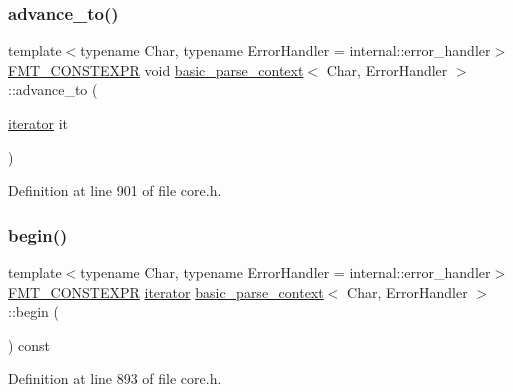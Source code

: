 \subsubsection{\texorpdfstring{advance\+\_\+to()}{advance\_to()}}
{\footnotesize\ttfamily template$<$typename Char, typename Error\+Handler = internal\+::error\+\_\+handler$>$ \\
\hyperlink{core_8h_a69201cb276383873487bf68b4ef8b4cd}{F\+M\+T\+\_\+\+C\+O\+N\+S\+T\+E\+X\+PR} void \hyperlink{classbasic__parse__context}{basic\+\_\+parse\+\_\+context}$<$ Char, Error\+Handler $>$\+::advance\+\_\+to (\begin{DoxyParamCaption}\item[{\hyperlink{classbasic__parse__context_ac3ff96575e89371a99076d8e84dbdbee}{iterator}}]{it }\end{DoxyParamCaption})\hspace{0.3cm}{\ttfamily [inline]}}



Definition at line 901 of file core.\+h.

\mbox{\label{classbasic__parse__context_a7310b2c2d78ceba845e0fcc380dc11dd}} 
\subsubsection{\texorpdfstring{begin()}{begin()}}
{\footnotesize\ttfamily template$<$typename Char, typename Error\+Handler = internal\+::error\+\_\+handler$>$ \\
\hyperlink{core_8h_a69201cb276383873487bf68b4ef8b4cd}{F\+M\+T\+\_\+\+C\+O\+N\+S\+T\+E\+X\+PR} \hyperlink{classbasic__parse__context_ac3ff96575e89371a99076d8e84dbdbee}{iterator} \hyperlink{classbasic__parse__context}{basic\+\_\+parse\+\_\+context}$<$ Char, Error\+Handler $>$\+::begin (\begin{DoxyParamCaption}{ }\end{DoxyParamCaption}) const\hspace{0.3cm}{\ttfamily [inline]}}



Definition at line 893 of file core.\+h.

\mbox{\label{classbasic__parse__context_a17562843a84ff128340e4b64fa66911e}} 
